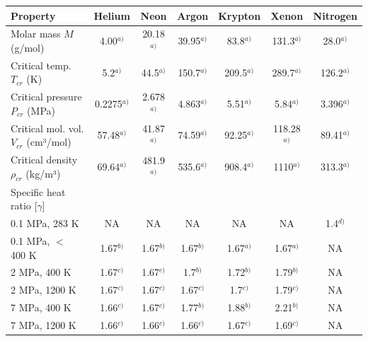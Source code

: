 \documentclass[final,5p,times,twocolumn]{elsarticle}
\begin{document}
    \begin{table}
        \centering
       \begin{tabular}{l c c c c c c}
\toprule
            \textbf{Property}     &      \textbf{Helium}     &      \textbf{Neon}          &        \textbf{Argon}    &  \textbf{Krypton} & \textbf{Xenon} & \textbf{Nitrogen}   \\                
\midrule
        \makecell[l]{Molar mass \\ $M$ (g/mol)}       &  4.00$^{a)}$  &   20.18$^{a)}$  &   39.95$^{a)}$ &  83.8$^{a)}$ & 131.3$^{a)}$ & 28.0$^{a)}$ \\
        \makecell[l]{Critical temp. \\ $T_{cr}$ (K)}  & 5.2$^{a)}$  &   44.5$^{a)}$  &   150.7$^{a)}$ & 209.5$^{a)}$ & 289.7$^{a)}$ & 126.2$^{a)}$ \\               
        \makecell[l]{Critical pressure \\ $P_{cr}$ (MPa)} &  0.2275$^{a)}$  &    2.678$^{a)}$  &    4.863$^{a)}$ &  5.51$^{a)}$ & 5.84$^{a)}$ &     3.396$^{a)}$ \\                 
        \makecell[l]{Critical mol. vol. \\ $V_{cr}$ (cm³/mol)}       & 57.48$^{a)}$  &    41.87$^{a)}$  &   74.59$^{a)}$ & 92.25$^{a)}$ & 118.28$^{a)}$ & 89.41$^{a)}$ \\
        \makecell[l]{Critical density    \\ $\rho_{cr}$ (kg/m³)}    & 69.64$^{a)}$  &   481.9$^{a)}$  &    535.6$^{a)}$ & 908.4$^{a)}$ & 1110$^{a)}$ & 313.3$^{a)}$ \\                   
\midrule    
            Specific heat ratio [$\gamma$] &   &   &   &   &   &   \\
            0.1 MPa, 283 K   &  NA & NA  & NA  & NA  &  NA & 1.4$^{d)}$ \\                                  
            0.1 MPa, $<$ 400 K  & 1.67$^{b)}$ & 1.67$^{b)}$ & 1.67$^{b)}$ & 1.67$^{a)}$ & 1.67$^{a)}$ & NA \\
            2 MPa, 400 K     &  1.67$^{c)}$ & 1.67$^{c)}$ & 1.7$^{b)}$  & 1.72$^{b)}$  & 1.79$^{b)}$  & NA \\    
            2 MPa, 1200 K    & 1.67$^{c)}$  & 1.67$^{c)}$  & 1.67$^{c)}$  & 1.7$^{c)}$  & 1.79$^{c)}$  &  NA\\
            7 MPa, 400 K     & 1.66$^{c)}$  &  1.67$^{c)}$ & 1.77$^{b)}$  & 1.88$^{b)}$  & 2.21$^{b)}$  & NA \\
            7 MPa, 1200 K     & 1.66$^{c)}$  & 1.66$^{c)}$  & 1.66$^{c)}$ & 1.67$^{c)}$  &  1.69$^{c)}$   & NA \\

\end{tabular}
\end{table}
\end{document}
